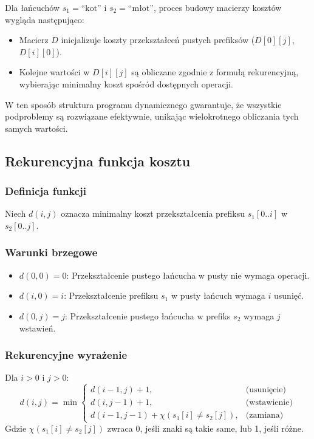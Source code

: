 Dla łańcuchów $s_1 = \text{``kot''}$ i $s_2 = \text{``młot''}$, proces budowy macierzy kosztów wygląda następująco:
\begin{itemize}
    \item Macierz $D$ inicjalizuje koszty przekształceń pustych prefiksów ($D[0][j]$, $D[i][0]$).
    \item Kolejne wartości w $D[i][j]$ są obliczane zgodnie z formułą rekurencyjną, wybierając minimalny koszt spośród dostępnych operacji.
\end{itemize}

W ten sposób struktura programu dynamicznego gwarantuje, że wszystkie podproblemy są rozwiązane efektywnie, unikając wielokrotnego obliczania tych samych wartości.

\subsection{Rekurencyjna funkcja kosztu}
\subsubsection{Definicja funkcji}
Niech \(d(i, j)\) oznacza minimalny koszt przekształcenia prefiksu \(s_1[0..i]\) w \(s_2[0..j]\).

\subsubsection{Warunki brzegowe}
\begin{itemize}
    \item \(d(0, 0) = 0\): Przekształcenie pustego łańcucha w pusty nie wymaga operacji.
    \item \(d(i, 0) = i\): Przekształcenie prefiksu \(s_1\) w pusty łańcuch wymaga \(i\) usunięć.
    \item \(d(0, j) = j\): Przekształcenie pustego łańcucha w prefiks \(s_2\) wymaga \(j\) wstawień.
\end{itemize}

\subsubsection{Rekurencyjne wyrażenie}
Dla \(i > 0\) i \(j > 0\):
\[
d(i, j) = \min \begin{cases} 
d(i-1, j) + 1, & \text{(usunięcie)} \\
d(i, j-1) + 1, & \text{(wstawienie)} \\
d(i-1, j-1) + \chi(s_1[i] \neq s_2[j]), & \text{(zamiana)}
\end{cases}
\] 
\label{eq:rekurencyjne-wyrazenie}
Gdzie \(\chi(s_1[i] \neq s_2[j])\) zwraca 0, jeśli znaki są takie same, lub 1, jeśli różne.

